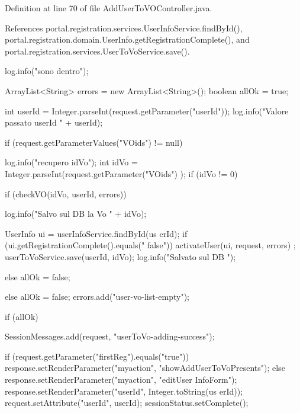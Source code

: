 Definition at line 70 of file AddUserToVOController.java.



References portal.registration.services.UserInfoService.findById(), portal.registration.domain.UserInfo.getRegistrationComplete(), and portal.registration.services.UserToVoService.save().


\begin{DoxyCode}
                                        {

                log.info("sono dentro");

                ArrayList<String> errors = new ArrayList<String>();
                boolean allOk = true;

                int userId = Integer.parseInt(request.getParameter("userId"));
                log.info("Valore passato userId " + userId);

                if (request.getParameterValues("VOids") != null) {
                        log.info("recupero idVo");
                        int idVo = Integer.parseInt(request.getParameter("VOids")
      );
                        if (idVo != 0) {

                                if (checkVO(idVo, userId, errors)) {
                                        log.info("Salvo sul DB la Vo " + idVo);

                                        UserInfo ui = userInfoService.findById(us
      erId);
                                        if (ui.getRegistrationComplete().equals("
      false")) {
                                                activateUser(ui, request, errors)
      ;
                                        }
                                        userToVoService.save(userId, idVo);
                                        log.info("Salvato sul DB ");
                                } else {
                                        allOk = false;
                                }
                        }

                } else {
                        allOk = false;
                        errors.add("user-vo-list-empty");
                }

                if (allOk) {

                        SessionMessages.add(request, "userToVo-adding-success");

                        if (request.getParameter("firstReg").equals("true")) {
                                response.setRenderParameter("myaction",
                                                "showAddUserToVoPresents");
                        } else {
                                response.setRenderParameter("myaction", "editUser
      InfoForm");
                        }
                        response.setRenderParameter("userId", Integer.toString(us
      erId));
                        request.setAttribute("userId", userId);
                        sessionStatus.setComplete();

}}
\end{DoxyCode}

